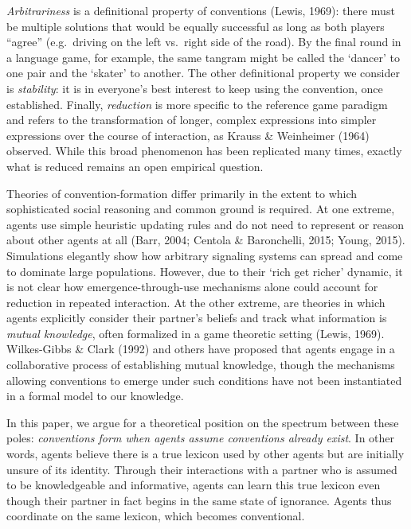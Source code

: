 \documentclass[manuscript]{stjour}
\begin{document}
\emph{Arbitrariness} is a definitional property of conventions (Lewis,
1969): there must be multiple solutions that would be equally successful
as long as both players ``agree'' (e.g.~driving on the left vs.~right
side of the road). By the final round in a language game, for example,
the same tangram might be called the `dancer' to one pair and the
`skater' to another. The other definitional property we consider is
\emph{stability}: it is in everyone's best interest to keep using the
convention, once established. Finally, \emph{reduction} is more specific
to the reference game paradigm and refers to the transformation of
longer, complex expressions into simpler expressions over the course of
interaction, as Krauss \& Weinheimer (1964) observed. While this broad
phenomenon has been replicated many times, exactly what is reduced
remains an open empirical question.

Theories of convention-formation differ primarily in the extent to which
sophisticated social reasoning and common ground is required. At one
extreme, agents use simple heuristic updating rules and do not need to
represent or reason about other agents at all (Barr, 2004; Centola \&
Baronchelli, 2015; Young, 2015). Simulations elegantly show how
arbitrary signaling systems can spread and come to dominate large
populations. However, due to their `rich get richer' dynamic, it is not
clear how emergence-through-use mechanisms alone could account for
reduction in repeated interaction. At the other extreme, are theories in
which agents explicitly consider their partner's beliefs and track what
information is \emph{mutual knowledge}, often formalized in a game
theoretic setting (Lewis, 1969). Wilkes-Gibbs \& Clark (1992) and others
have proposed that agents engage in a collaborative process of
establishing mutual knowledge, though the mechanisms allowing
conventions to emerge under such conditions have not been instantiated
in a formal model to our knowledge.

In this paper, we argue for a theoretical position on the spectrum
between these poles: \emph{conventions form when agents assume
conventions already exist}. In other words, agents believe there is a
true lexicon used by other agents but are initially unsure of its
identity. Through their interactions with a partner who is assumed to be
knowledgeable and informative, agents can learn this true lexicon even
though their partner in fact begins in the same state of ignorance.
Agents thus coordinate on the same lexicon, which becomes conventional.
\end{document}
